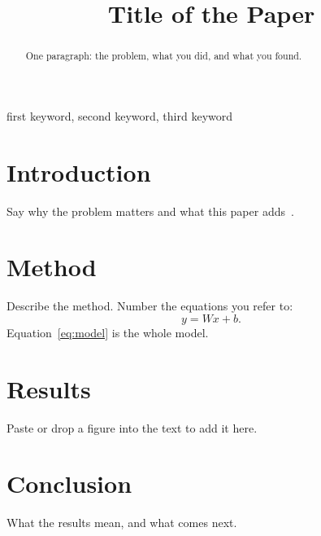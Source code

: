 \documentclass[conference]{IEEEtran}
\begin{document}
\title{Title of the Paper}

\author{
\and
{}
}

\maketitle

\begin{abstract}
One paragraph: the problem, what you did, and what you found.
\end{abstract}

\begin{IEEEkeywords}
first keyword, second keyword, third keyword
\end{IEEEkeywords}

\section{Introduction}
Say why the problem matters and what this paper adds~\cite{knuth1984}.

\section{Method}
Describe the method. Number the equations you refer to:
\begin{equation}
  y = Wx + b. \label{eq:model}
\end{equation}
Equation~\eqref{eq:model} is the whole model.

\section{Results}
Paste or drop a figure into the text to add it here.

\section{Conclusion}
What the results mean, and what comes next.



\end{document}
